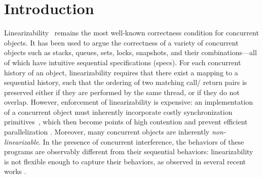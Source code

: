 
\section{Introduction}
\label{sec:introduction}

 
Linearizability~\cite{Herlihy-Wing:TOPLAS90} remains the most
well-known correctness condition for concurrent objects. It has been
used to argue the correctness of a variety of concurrent objects such
as stacks, queues, sets, locks, snapshots, and their
combinations---all of which have intuitive sequential specifications
(specs).
%
For each concurrent history of an object, linearizability requires
that there exist a mapping to a sequential history, such that the
ordering of two matching call/ return pairs is preserved either if
they are performed by the same thread, or if they do not overlap.
%
However, enforcement of linearizability is expensive: an
implementation of a concurrent object must inherently incorporate
costly synchronization primitives~\cite{Attiya-al:POPL11}, which then
become points of high contention and prevent efficient parallelization
\cite{Shavit:CACM11}. Moreover, many concurrent objects are inherently
\emph{non-linearizable}. In the presence of concurrent interference,
the behaviors of these programs are observably different from their
sequential behaviors: linearizability is not flexible enough to
capture their behaviors, as observed in several recent works
\cite{Hemed-Rinetzky:PODC14,Shavit:CACM11,Derrick-al:FM14,Jagadeesan-Riely:ICALP14}.


